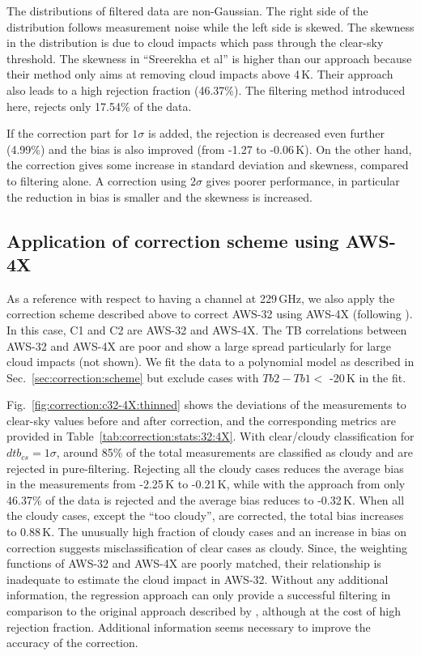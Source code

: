 \documentclass[12pt]{article}
\begin{document}
The distributions of filtered data are non-Gaussian. The right side of the
distribution follows measurement noise while the left side is skewed. The
skewness in the distribution is due to cloud impacts which pass through the
clear-sky threshold. The skewness in ``Sreerekha et al'' is higher than our approach because their method only aims at removing cloud impacts above 4\,K. Their approach also leads to a high rejection fraction (46.37\%). The filtering 
method introduced here, rejects only 17.54\% of the data.

If the correction part for $1\sigma$ is added, the rejection is decreased even further (4.99\%)
and the bias is also improved (from -1.27 to -0.06\,K). On the other hand, the
correction gives some increase in standard deviation and skewness, compared to
filtering alone. A correction using $2\sigma$ gives poorer performance, in particular the reduction in bias is smaller and the skewness is increased.


%
\subsection{Application of correction scheme using AWS-4X}
%

As a reference with respect to having a channel at 229\,GHz, we also apply the
correction scheme described above to correct AWS-32 using AWS-4X (following
\citet{rekha2012potential}). In this case, C1 and C2 are AWS-32 and AWS-4X. The
TB correlations between AWS-32 and AWS-4X are poor and show a large spread
particularly for large cloud impacts (not shown). We fit the data to a polynomial model as described in Sec.~\ref{sec:correction:scheme} but exclude cases with $Tb2-Tb1 <$ -20\,K in the fit.

Fig.~\ref{fig:correction:c32-4X:thinned} shows the deviations of the
measurements to clear-sky values before and after correction, and the
corresponding metrics are provided in Table~\ref{tab:correction:stats:32:4X}.
With clear/cloudy classification for $dtb_{cs} = 1\sigma$, around 85\% of the
total measurements are classified as cloudy and are rejected in pure-filtering.
Rejecting all the cloudy cases reduces the average bias in the measurements
from -2.25\,K to -0.21\,K, while with the approach from
\citet{rekha2012potential} only 46.37\% of the data is rejected and the average
bias reduces to -0.32\,K. When all the cloudy cases, except the ``too cloudy'',
are corrected, the total bias increases to 0.88\,K. The unusually high fraction
of cloudy cases and an increase in bias on correction suggests
misclassification of clear cases as cloudy. Since, the weighting functions of
AWS-32 and AWS-4X are poorly matched, their relationship is inadequate to
estimate the cloud impact in AWS-32. Without any additional information, the
regression approach can only provide a successful filtering in comparison to
the original approach described by \citet{rekha2012potential}, although at the
cost of high rejection fraction. Additional information seems necessary to improve
the accuracy of the correction.
\end{document}
